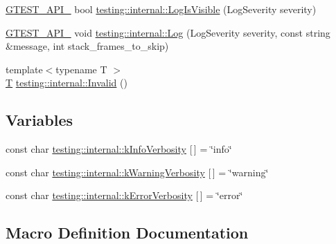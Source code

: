 \begin{DoxyCompactItemize}
\item 
\hyperlink{gtest-port_8h_aa73be6f0ba4a7456180a94904ce17790}{G\+T\+E\+S\+T\+\_\+\+A\+P\+I\+\_\+} bool \hyperlink{namespacetesting_1_1internal_a69ffdba5ee36743e88d8f89b79e566ff}{testing\+::internal\+::\+Log\+Is\+Visible} (Log\+Severity severity)
\item 
\hyperlink{gtest-port_8h_aa73be6f0ba4a7456180a94904ce17790}{G\+T\+E\+S\+T\+\_\+\+A\+P\+I\+\_\+} void \hyperlink{namespacetesting_1_1internal_ac0bc151763a8187d74387c4b2ba685c9}{testing\+::internal\+::\+Log} (Log\+Severity severity, const string \&message, int stack\+\_\+frames\+\_\+to\+\_\+skip)
\item 
{\footnotesize template$<$typename T $>$ }\\\hyperlink{functions__7_8js_adf1f3edb9115acb0a1e04209b7a9937b}{T} \hyperlink{namespacetesting_1_1internal_a3316c24e8a79f5def3e85d763ae50854}{testing\+::internal\+::\+Invalid} ()
\end{DoxyCompactItemize}
\subsection*{Variables}
\begin{DoxyCompactItemize}
\item 
const char \hyperlink{namespacetesting_1_1internal_a96274a788ffc75a6dffdfa8aa1f34fb9}{testing\+::internal\+::k\+Info\+Verbosity} \mbox{[}$\,$\mbox{]} = \char`\"{}info\char`\"{}
\item 
const char \hyperlink{namespacetesting_1_1internal_ad9386ccda6b6deac2f7b84784d3088c0}{testing\+::internal\+::k\+Warning\+Verbosity} \mbox{[}$\,$\mbox{]} = \char`\"{}warning\char`\"{}
\item 
const char \hyperlink{namespacetesting_1_1internal_a3d730761274e7b80dd66e5014171fcb5}{testing\+::internal\+::k\+Error\+Verbosity} \mbox{[}$\,$\mbox{]} = \char`\"{}error\char`\"{}
\end{DoxyCompactItemize}


\subsection{Macro Definition Documentation}
